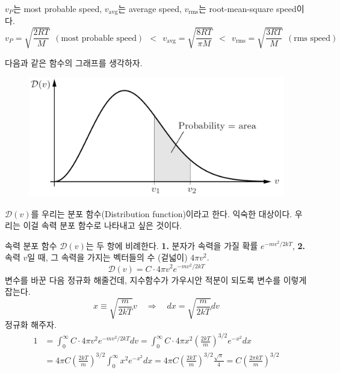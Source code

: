 \documentclass{article}
\begin{document}
\noindent
$v_P$는 most probable speed, $v_{\text{avg}}$는 average speed, $v_{\text{rms}}$는 root-mean-square speed이다.
\begin{equation}
    \boxed{v_P = \sqrt{\frac{2RT}{M}} \ \ (\text{most probable speed})} \ \ <  \ \ \boxed{v_{\text{avg}} = \sqrt{\frac{8RT}{\pi M}}} \ \ < \ \ \boxed{v_{\text{rms}} = \sqrt{\frac{3RT}{M}} \ \ (\text{rms speed})}
\end{equation}

다음과 같은 함수의 그래프를 생각하자.

\begin{figure}[h]
    \centering
    \includegraphics[width=0.6\linewidth]{images/fig4_2.png}
\end{figure}

$\mathcal{D}(v)$를 우리는 분포 함수(Distribution function)이라고 한다. 익숙한 대상이다. 우리는 이걸 속력 분포 함수로 나타내고 싶은 것이다.

속력 분포 함수 $\mathcal{D}(v)$는 두 항에 비례한다. \textbf{1.} 분자가 속력을 가질 확률 $e^{-mv^2/2kT}$, \textbf{2.} 속력 $v$일 때, 그 속력을 가지는 벡터들의 수 (겉넓이) $4\pi v^2$.
\begin{equation}
    \mathcal{D}(v) = C \cdot 4\pi v^2 e^{-mv^2/2kT}
\end{equation}
변수를 바꾼 다음 정규화 해줄건데, 지수함수가 가우시안 적분이 되도록 변수를 이렇게 잡는다.
\begin{equation}
    x \equiv \sqrt{\frac{m}{2kT}} v \quad \Rightarrow \quad dx = \sqrt{\frac{m}{2kT}} dv
\end{equation}
정규화 해주자.
\begin{align} \nonumber
    1 &= \int_0^\infty C \cdot 4\pi v^2 e^{-mv^2/2kT} dv = \int_0^\infty C \cdot 4\pi x^2 \left( \frac{2kT}{m} \right)^{3/2} e^{-x^2} dx\\
    &= 4\pi C \left( \frac{2kT}{m} \right)^{3/2} \int_0^\infty x^2 e^{-x^2} dx
    = 4\pi C \left( \frac{2kT}{m} \right)^{3/2} \frac{\sqrt{\pi}}{4} = C \left( \frac{2\pi kT}{m} \right)^{3/2}
\end{align}

\newpage
\end{document}
